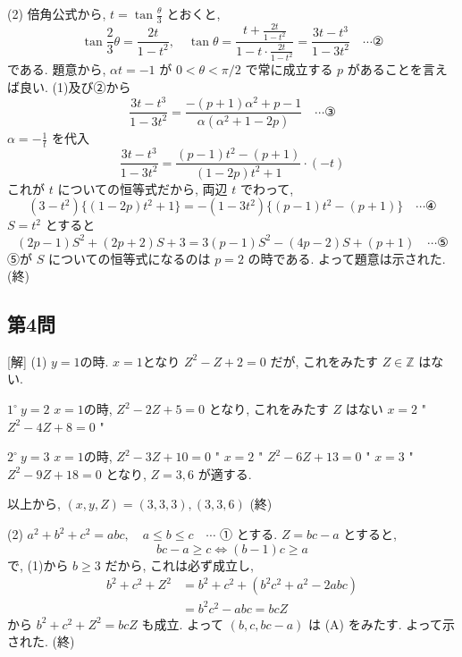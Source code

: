 \documentclass[../main.tex]{subfiles}
\begin{document}
(2) 倍角公式から, $t = \tan\frac{\theta}{3}$ とおくと,
\[ \tan\frac{2}{3}\theta = \frac{2t}{1-t^2}, \quad \tan\theta = \frac{t + \frac{2t}{1-t^2}}{1 - t\cdot\frac{2t}{1-t^2}} = \frac{3t - t^3}{1 - 3t^2} \quad \cdots \text{②} \]
である. 題意から, $\alpha t = -1$ が $0 < \theta < \pi/2$ で常に成立する $p$ があることを言えば良い.
(1)及び②から
\[ \frac{3t - t^3}{1 - 3t^2} = \frac{-(p+1)\alpha^2 + p - 1}{\alpha(\alpha^2 + 1 - 2p)} \quad \cdots \text{③} \]
$\alpha = -\frac{1}{t}$ を代入
\[ \frac{3t - t^3}{1 - 3t^2} = \frac{(p-1)t^2 - (p+1)}{(1 - 2p)t^2 + 1} \cdot (-t) \]
これが $t$ についての恒等式だから, 両辺 $t$ でわって,
\[ (3 - t^2)\{(1 - 2p)t^2 + 1\} = -(1 - 3t^2)\{(p - 1)t^2 - (p + 1)\} \quad \cdots \text{④} \]
$S = t^2$ とすると
\[ (2p - 1)S^2 + (2p + 2)S + 3 = 3(p - 1)S^2 - (4p - 2)S + (p + 1) \quad \cdots \text{⑤} \]
⑤が $S$ についての恒等式になるのは $p=2$ の時である. よって題意は示された. (終)

\begin{center}
\end{center}

\subsection*{第4問}
[解] (1) $y=1$の時. $x=1$となり $Z^2 - Z + 2 = 0$ だが, これをみたす $Z \in \mathbb{Z}$ はない.

$1^\circ \ y=2$
$x=1$の時, $Z^2 - 2Z + 5 = 0$ となり, これをみたす $Z$ はない
$x=2$ " $Z^2 - 4Z + 8 = 0$ "

$2^\circ \ y=3$
$x=1$の時, $Z^2 - 3Z + 10 = 0$ "
$x=2$ " $Z^2 - 6Z + 13 = 0$ "
$x=3$ " $Z^2 - 9Z + 18 = 0$ となり, $Z=3, 6$ が適する.

以上から, $(x, y, Z) = (3, 3, 3), (3, 3, 6)$ (終)

(2) $a^2 + b^2 + c^2 = abc, \quad a \le b \le c \quad \cdots$ ① とする. $Z = bc - a$ とすると,
\[ bc - a \ge c \iff (b - 1)c \ge a \]
で, (1)から $b \ge 3$ だから, これは必ず成立し,
\begin{align*}
  b^2 + c^2 + Z^2 &= b^2 + c^2 + (b^2c^2 + a^2 - 2abc) \\
  &= b^2c^2 - abc = bcZ
\end{align*}
から $b^2 + c^2 + Z^2 = bcZ$ も成立. よって $(b, c, bc - a)$ は (A) をみたす. よって示された. (終)
\end{document}
